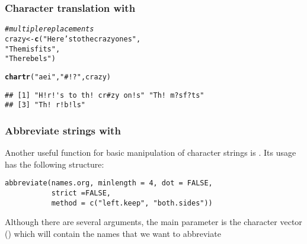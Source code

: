 \documentclass[12pt]{beamer}\usepackage[]{graphicx}\usepackage[]{color}
\makeatletter
\newcommand{\hlstr}[1]{\textcolor[rgb]{0.192,0.494,0.8}{#1}}%
\newcommand{\hlcom}[1]{\textcolor[rgb]{0.678,0.584,0.686}{\textit{#1}}}%
\newcommand{\hlstd}[1]{\textcolor[rgb]{0.345,0.345,0.345}{#1}}%
\newcommand{\hlkwb}[1]{\textcolor[rgb]{0.69,0.353,0.396}{#1}}%
\newcommand{\hlkwd}[1]{\textcolor[rgb]{0.737,0.353,0.396}{\textbf{#1}}}%
\newenvironment{kframe}{%
 \def\at@end@of@kframe{}%
 \ifinner\ifhmode%
  \def\at@end@of@kframe{\end{minipage}}%
  \begin{minipage}{\columnwidth}%
 \fi\fi%
 \def\FrameCommand##1{\hskip\@totalleftmargin \hskip-\fboxsep
 \colorbox{shadecolor}{##1}\hskip-\fboxsep
     \hskip-\linewidth \hskip-\@totalleftmargin \hskip\columnwidth}%
 \MakeFramed {\advance\hsize-\width
   \@totalleftmargin\z@ \linewidth\hsize
   \@setminipage}}%
 {\par\unskip\endMakeFramed%
 \at@end@of@kframe}
\newenvironment{knitrout}{}{} %
\makeatother
\begin{document}
\begin{frame}[fragile]
\frametitle{Character translation with }

\begin{knitrout}\footnotesize
{}\color{fgcolor}\begin{kframe}
\begin{alltt}
\hlcom{# multiple replacements}
\hlstd{crazy} \hlkwb{<-} \hlkwd{c}\hlstd{(}\hlstr{"Here's to the crazy ones"}\hlstd{,}
           \hlstr{"The misfits"}\hlstd{,}
           \hlstr{"The rebels"}\hlstd{)}

\hlkwd{chartr}\hlstd{(}\hlstr{"aei"}\hlstd{,} \hlstr{"#!?"}\hlstd{, crazy)}
\end{alltt}
\begin{verbatim}
## [1] "H!r!'s to th! cr#zy on!s" "Th! m?sf?ts"             
## [3] "Th! r!b!ls"
\end{verbatim}
\end{kframe}
\end{knitrout}

\end{frame}


\begin{frame}[fragile]
\frametitle{Abbreviate strings with }

Another useful function for basic manipulation of character strings is . Its usage has the following structure:

\begin{verbatim}
abbreviate(names.org, minlength = 4, dot = FALSE, 
           strict =FALSE,
           method = c("left.keep", "both.sides"))
\end{verbatim}

Although there are several arguments, the main parameter is the character vector () which will contain the names that we want to abbreviate

\end{frame}

\end{document}
